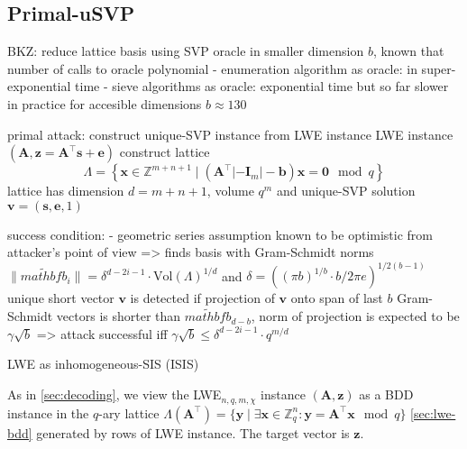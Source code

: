 \subsection{Primal-uSVP \cite{ADPS16, BG14}} %

BKZ: reduce lattice basis using SVP oracle in smaller dimension $b$, known that number of calls to oracle polynomial
- enumeration algorithm as oracle: in super-exponential time
- sieve algorithms as oracle: exponential time but so far slower in practice for accesible dimensions $b\approx 130$

primal attack: construct unique-SVP instance from LWE instance %
LWE instance $(\mathbf{A}, \mathbf{z} = \mathbf{A}^\intercal \mathbf{s} + \mathbf{e})$
construct lattice 
\begin{equation}
  \Lambda = \left\{ \mathbf{x} \in \mathbb{Z}^{m+n+1} \mid (\mathbf{A}^\intercal | -\mathbf{I}_m | -\mathbf{b})\mathbf{x} = \mathbf{0} \mod q \right\} 
\end{equation}
lattice has dimension $d=m+n+1$, volume $q^m$ %
and unique-SVP solution $\mathbf{v} = (\mathbf{s}, \mathbf{e}, 1)$ %

success condition:
- geometric series assumption known to be optimistic from attacker's point of view
=> finds basis with Gram-Schmidt norms $\|\tilde{mathbf{b}}_i\| = \delta^{d - 2i-1} \cdot \text{Vol}(\Lambda)^{1/d}$ and $\delta = ((\pi b)^{1/b} \cdot b/2\pi e)^{1/2(b-1)}$ %
unique short vector $\mathbf{v}$ is detected if projection of $\mathbf{v}$ onto span of last $b$ Gram-Schmidt vectors is shorter than $\tilde{mathbf{b}}_{d-b}$, norm of projection is expected to be $\gamma \sqrt{b}$ => attack successful iff $\gamma \sqrt{b} \leq \delta^{d - 2i-1} \cdot q^{m/d}$

LWE as inhomogeneous-SIS (ISIS)

As in \cref{sec:decoding}, we view the LWE$_{n, q, m, \chi}$ instance $(\mathbf{A}, \mathbf{z})$ as a BDD instance in the  $q$-ary lattice $\Lambda(\mathbf{A}^\intercal) = \{ \mathbf{y} \mid \exists \mathbf{x} \in \mathbb{Z}_q^n : \mathbf{y} = \mathbf{A}^\intercal \mathbf{x}  \mod q \}$ \cref{sec:lwe-bdd} generated by rows of LWE instance. The target vector is $\mathbf{z}$. %

